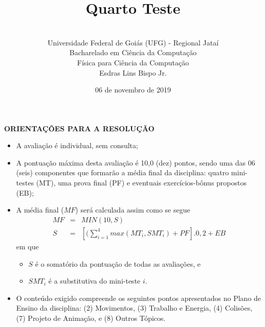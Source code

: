 \documentclass[12pt,a4paper,oneside]{article}
\author{\\Universidade Federal de Goiás (UFG) - Regional Jataí\\Bacharelado em Ciência da Computação \\Física para Ciência da Computação \\Esdras Lins Bispo Jr.}
\title{\sc \huge Quarto Teste}
\date{06 de novembro de 2019}
\begin{document}
\maketitle

{\bf ORIENTAÇÕES PARA A RESOLUÇÃO}

\footnotesize

\begin{itemize}
	\item A avaliação é individual, sem consulta;
	\item A pontuação máxima desta avaliação é 10,0 (dez) pontos, sendo uma das 06 (seis) componentes que formarão a média final da disciplina: quatro mini-testes (MT), uma prova final (PF) e eventuais exercícios-bônus propostos (EB);
	\item A média final ($MF$) será calculada assim como se segue
	\begin{eqnarray}
	MF & = & MIN(10, S) \nonumber \\
	S & = & [(\sum_{i=1}^{4} max(MT_i, SMT_i ) + PF].0,2  + EB \nonumber
	\end{eqnarray}
	em que 
	\begin{itemize}
		\item $S$ é o somatório da pontuação de todas as avaliações, e
		\item $SMT_i$ é a substitutiva do mini-teste $i$.
	\end{itemize}
	\item O conteúdo exigido compreende os seguintes pontos apresentados no Plano de Ensino da disciplina: (2) Movimentos, (3) Trabalho e Energia, (4) Colisões, (7) Projeto de Animação, e (8) Outros Tópicos.
\end{itemize}


\begin{center}
\end{center}

\newpage

\normalsize
\end{document}

